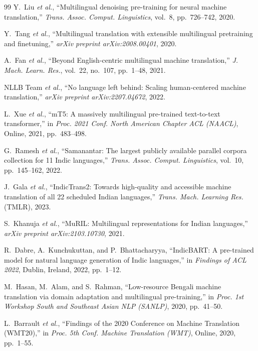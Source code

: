 \documentclass[conference]{IEEEtran}
\begin{document}
\begin{thebibliography}{99}
Y.~Liu \textit{et al.},
``Multilingual denoising pre-training for neural machine translation,''
\emph{Trans. Assoc. Comput. Linguistics}, vol.~8, pp.~726--742, 2020.

Y.~Tang \textit{et al.},
``Multilingual translation with extensible multilingual pretraining and
finetuning,''
\textit{arXiv preprint arXiv:2008.00401}, 2020.

A.~Fan \textit{et al.},
``Beyond English-centric multilingual machine translation,''
\emph{J. Mach. Learn. Res.}, vol.~22, no.~107, pp.~1--48, 2021.

NLLB Team \textit{et al.},
``No language left behind: Scaling human-centered machine translation,''
\textit{arXiv preprint arXiv:2207.04672}, 2022.

L.~Xue \textit{et al.},
``mT5: A massively multilingual pre-trained text-to-text transformer,''
in \emph{Proc. 2021 Conf. North American Chapter ACL (NAACL)},
Online, 2021, pp.~483--498.

G.~Ramesh \textit{et al.},
``Samanantar: The largest publicly available parallel corpora collection
for 11 Indic languages,''
\emph{Trans. Assoc. Comput. Linguistics}, vol.~10, pp.~145--162, 2022.

J.~Gala \textit{et al.},
``IndicTrans2: Towards high-quality and accessible machine translation of
all 22 scheduled Indian languages,''
\emph{Trans. Mach. Learning Res.} (TMLR), 2023.

S.~Khanuja \textit{et al.},
``MuRIL: Multilingual representations for Indian languages,''
\textit{arXiv preprint arXiv:2103.10730}, 2021.

R.~Dabre, A.~Kunchukuttan, and P.~Bhattacharyya,
``IndicBART: A pre-trained model for natural language generation of
Indic languages,''
in \emph{Findings of ACL 2022},
Dublin, Ireland, 2022, pp.~1--12.

M.~Hasan, M.~Alam, and S.~Rahman,
``Low-resource Bengali machine translation via domain adaptation and
multilingual pre-training,''
in \emph{Proc. 1st Workshop South and Southeast Asian NLP (SANLP)},
2020, pp.~41--50.

L.~Barrault \textit{et al.},
``Findings of the 2020 Conference on Machine Translation (WMT20),''
in \emph{Proc. 5th Conf. Machine Translation (WMT)},
Online, 2020, pp.~1--55.


\end{thebibliography}
\end{document}

